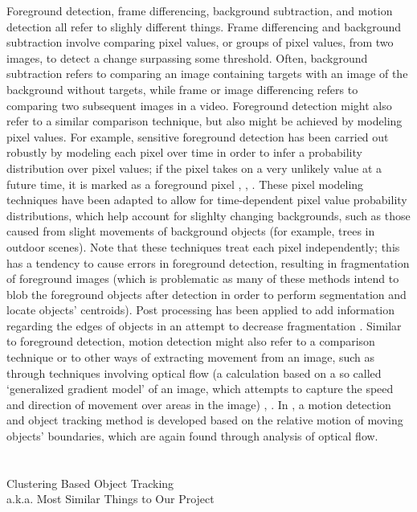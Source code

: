 \documentclass{article}
\begin{document}
Foreground detection, frame differencing, background subtraction, and motion detection all refer to slighly different things. Frame differencing and background subtraction involve comparing pixel values, or groups of pixel values, from two images, to detect a change surpassing some threshold. Often, background subtraction refers to comparing an image containing targets with an image of the background without targets, while frame or image differencing refers to comparing two subsequent images in a video. Foreground detection might also refer to a similar comparison technique, but also might be achieved by modeling pixel values. For example, sensitive foreground detection has been carried out robustly by modeling each pixel over time in order to infer a probability distribution over pixel values; if the pixel takes on a very unlikely value at a future time, it is marked as a foreground pixel \cite{stauffer_1999}, \cite{elgammal_2000}, \cite{elgammal_2002}. These pixel modeling techniques have been adapted to allow for time-dependent pixel value probability distributions, which help account for slighlty changing backgrounds, such as those caused from slight movements of background objects (for example, trees in outdoor scenes). Note that these techniques treat each pixel independently; this has a tendency to cause errors in foreground detection, resulting in fragmentation of foreground images (which is problematic as many of these methods intend to blob the foreground objects after detection in order to perform segmentation and locate objects' centroids). Post processing has been applied to add information regarding the edges of objects in an attempt to decrease fragmentation \cite{turdu_2007}. Similar to foreground detection, motion detection might also refer to a comparison technique or to other ways of extracting movement from an image, such as through techniques involving optical flow (a calculation based on a so called `generalized gradient model' of an image, which attempts to capture the speed and direction of movement over areas in the image) \cite{horn_1981}, \cite{bobick_2001}. In \cite{black_2000}, a motion detection and object tracking method is developed based on the relative motion of moving objects' boundaries, which are again found through analysis of optical flow.\\
\\
\\
Clustering Based Object Tracking \\
a.k.a. Most Similar Things to Our Project \\
\end{document}
